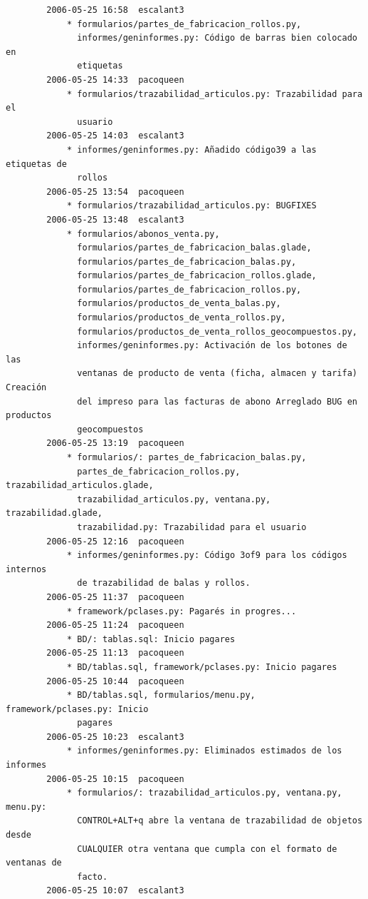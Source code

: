 \documentclass[a4paper]{article}
\begin{document}
\begin{verbatim}
        2006-05-25 16:58  escalant3
            * formularios/partes_de_fabricacion_rollos.py,
              informes/geninformes.py: Código de barras bien colocado en
              etiquetas
        2006-05-25 14:33  pacoqueen
            * formularios/trazabilidad_articulos.py: Trazabilidad para el
              usuario
        2006-05-25 14:03  escalant3
            * informes/geninformes.py: Añadido código39 a las etiquetas de
              rollos
        2006-05-25 13:54  pacoqueen
            * formularios/trazabilidad_articulos.py: BUGFIXES
        2006-05-25 13:48  escalant3
            * formularios/abonos_venta.py,
              formularios/partes_de_fabricacion_balas.glade,
              formularios/partes_de_fabricacion_balas.py,
              formularios/partes_de_fabricacion_rollos.glade,
              formularios/partes_de_fabricacion_rollos.py,
              formularios/productos_de_venta_balas.py,
              formularios/productos_de_venta_rollos.py,
              formularios/productos_de_venta_rollos_geocompuestos.py,
              informes/geninformes.py: Activación de los botones de las
              ventanas de producto de venta (ficha, almacen y tarifa) Creación
              del impreso para las facturas de abono Arreglado BUG en productos
              geocompuestos
        2006-05-25 13:19  pacoqueen
            * formularios/: partes_de_fabricacion_balas.py,
              partes_de_fabricacion_rollos.py, trazabilidad_articulos.glade,
              trazabilidad_articulos.py, ventana.py, trazabilidad.glade,
              trazabilidad.py: Trazabilidad para el usuario
        2006-05-25 12:16  pacoqueen
            * informes/geninformes.py: Código 3of9 para los códigos internos
              de trazabilidad de balas y rollos.
        2006-05-25 11:37  pacoqueen
            * framework/pclases.py: Pagarés in progres...
        2006-05-25 11:24  pacoqueen
            * BD/: tablas.sql: Inicio pagares
        2006-05-25 11:13  pacoqueen
            * BD/tablas.sql, framework/pclases.py: Inicio pagares
        2006-05-25 10:44  pacoqueen
            * BD/tablas.sql, formularios/menu.py, framework/pclases.py: Inicio
              pagares
        2006-05-25 10:23  escalant3
            * informes/geninformes.py: Eliminados estimados de los informes
        2006-05-25 10:15  pacoqueen
            * formularios/: trazabilidad_articulos.py, ventana.py, menu.py:
              CONTROL+ALT+q abre la ventana de trazabilidad de objetos desde
              CUALQUIER otra ventana que cumpla con el formato de ventanas de
              facto.
        2006-05-25 10:07  escalant3

\end{verbatim}
\end{document}
